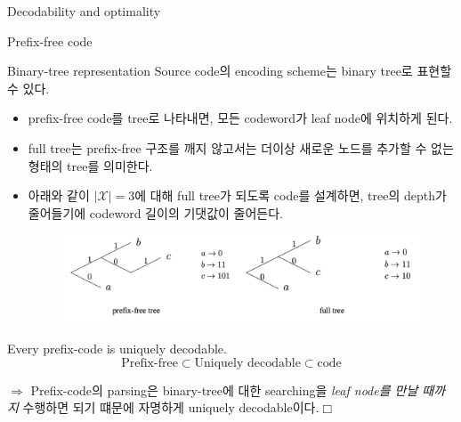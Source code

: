 \documentclass[9pt]{beamer}
\begin{document}
\begin{section}{Decodability and optimality}
\begin{frame}{Prefix-free code}
        \end{frame}

        \begin{frame}{Binary-tree representation}
            Source code의 encoding scheme는 binary tree로 표현할 수 있다.
            \begin{itemize}
                \item prefix-free code를 tree로 나타내면, \alert{모든 codeword가 leaf node}에 위치하게 된다.
                \item full tree는 prefix-free 구조를 깨지 않고서는 더이상 새로운 노드를 추가할 수 없는 형태의 tree를 의미한다.
                \item 아래와 같이 $|\mathcal X|=3$에 대해 full tree가 되도록 code를 설계하면, tree의 depth가 줄어들기에 codeword 길이의 기댓값이 줄어든다.
                \begin{figure}
                    \includegraphics[width=0.75\columnwidth]{image/L3_full_tree_and_prefix_free.png}
                \end{figure}
            \end{itemize}
            \begin{theorem}
                Every prefix-code is uniquely decodable.
                $$ \text{Prefix-free} \subset \text{Uniquely decodable} \subset \text{code} $$
            \end{theorem}
            $\Rightarrow$ Prefix-code의 parsing은 binary-tree에 대한 searching을 \textit{leaf node를 만날 때까지} 수행하면 되기 떄문에 자명하게 uniquely decodable이다.$\Box$
        \end{frame}


\end{section}
\end{document}
